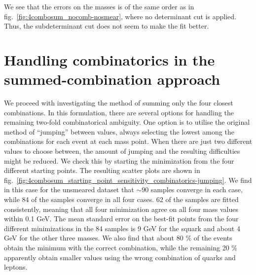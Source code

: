 \documentclass[twoside,english]{uiofysmaster}
\begin{document}
 We see that the errors on the masses is of the same order as in fig.\ \ref{fig:4combosum_nocomb-nosmear}, where no determinant cut is applied. Thus, the subdeterminant cut does not seem to make the fit better.


\section{Handling combinatorics in the summed-combination approach}
\label{sec:handling_combinatorics_summed-combo}
We proceed with investigating the method of summing only the four closest combinations. In this formulation, there are several options for handling the remaining two-fold combinatorical ambiguity. One option is to utilise the original method of ``jumping'' between values, always selecting the lowest among the combinations for each event at each mass point. When there are just two different values to choose between, the amount of jumping and the resulting difficulties might be reduced. We check this by starting the minimization from the four different starting points. The resulting scatter plots are shown in fig.\ \ref{fig:4combosum_starting_point_sensitivity_combinatorics-jumping}. We find in this case for the unsmeared dataset that $\sim 90$ samples converge in each case, while 84 of the samples converge in all four cases. 62 of the samples are fitted consistently, meaning that all four minimization agree on all four mass values within 0.1 GeV. The mean standard error on the best-fit points from the four different minimizations in the 84 samples is 9 GeV for the squark and about 4 GeV for the other three masses. We also find that about 80 \% of the events obtain the minimum with the correct combination, while the remaining 20 \% apparently obtain smaller values using the wrong combination of quarks and leptons.
\end{document}
